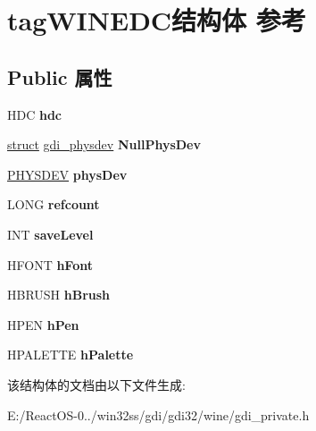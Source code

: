 \hypertarget{structtag_w_i_n_e_d_c}{}\section{tag\+W\+I\+N\+E\+D\+C结构体 参考}
\label{structtag_w_i_n_e_d_c}
\subsection*{Public 属性}
\begin{DoxyCompactItemize}
\item 
\mbox{\label{structtag_w_i_n_e_d_c_a7761bed00ed10250bfe6b0c150ef3caf}} 
H\+DC {\bfseries hdc}
\item 
\mbox{\label{structtag_w_i_n_e_d_c_a0bf97bf9324f064b5e38a61c22ce5200}} 
\hyperlink{interfacestruct}{struct} \hyperlink{structgdi__physdev}{gdi\+\_\+physdev} {\bfseries Null\+Phys\+Dev}
\item 
\mbox{\label{structtag_w_i_n_e_d_c_aa24c3aeb0d5f53f3d1b8c7d1cbcc3169}} 
\hyperlink{structgdi__physdev}{P\+H\+Y\+S\+D\+EV} {\bfseries phys\+Dev}
\item 
\mbox{\label{structtag_w_i_n_e_d_c_a4868546ae81ee2a76fdd2184506e4c68}} 
L\+O\+NG {\bfseries refcount}
\item 
\mbox{\label{structtag_w_i_n_e_d_c_a603b5d70037cc13f34333dabc2e21f9e}} 
I\+NT {\bfseries save\+Level}
\item 
\mbox{\label{structtag_w_i_n_e_d_c_a82acc27e0ed7fc83def4645b1483d2e2}} 
H\+F\+O\+NT {\bfseries h\+Font}
\item 
\mbox{\label{structtag_w_i_n_e_d_c_aa3ef8be60178f84aa7af8e048a3485b6}} 
H\+B\+R\+U\+SH {\bfseries h\+Brush}
\item 
\mbox{\label{structtag_w_i_n_e_d_c_a5e09c451601e82f8b7a7e6256cd0056f}} 
H\+P\+EN {\bfseries h\+Pen}
\item 
\mbox{\label{structtag_w_i_n_e_d_c_a298598e9beb37b0ce13ea1e126743d6e}} 
H\+P\+A\+L\+E\+T\+TE {\bfseries h\+Palette}
\end{DoxyCompactItemize}


该结构体的文档由以下文件生成\+:\begin{DoxyCompactItemize}
\item 
E\+:/\+React\+O\+S-\/0../win32ss/gdi/gdi32/wine/gdi\+\_\+private.\+h\end{DoxyCompactItemize}
